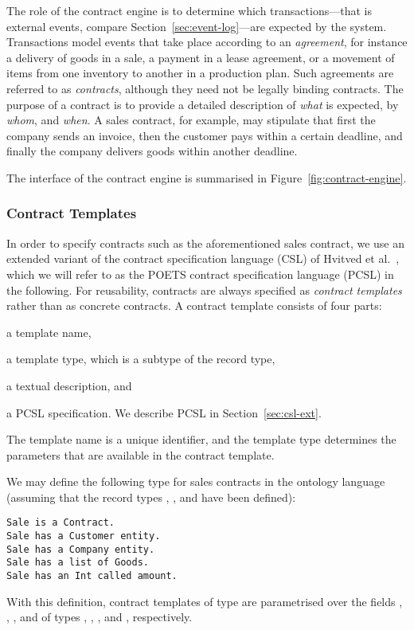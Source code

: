 The role of the contract engine is to determine which
transactions---that is external events, compare
Section~\ref{sec:event-log}---are expected by the
system. Transactions model events that take place according to an
\emph{agreement}, for instance a delivery of goods in a sale, a payment in a
lease agreement, or a movement of items from one inventory to another
in a production plan. Such agreements are referred to as
\emph{contracts}, although they need not be legally binding
contracts. The purpose of a contract is to provide a detailed
description of \emph{what} is expected, by \emph{whom}, and
\emph{when}. A sales contract, for example, may stipulate that first
the company sends an invoice, then the customer pays within a certain
deadline, and finally the company delivers goods within another
deadline.

The interface of the contract engine is summarised in
Figure~\ref{fig:contract-engine}.

\subsubsection{Contract Templates}
\label{sec:contract-templates}
In order to specify contracts such as the aforementioned sales
contract, we use an extended variant of the contract specification
language (CSL) of Hvitved et al.~\cite{hvitved11jlap}, which we will
refer to as the POETS contract specification language (PCSL) in the
following. For reusability, contracts are always specified as
\emph{contract templates} rather than as concrete contracts. A
contract template consists of four parts:
\begin{inparaenum}[(i)]
\item a template name,
\item a template type, which is a subtype of the 
  record type,
\item a textual description, and
\item a PCSL specification. We describe PCSL in Section~\ref{sec:csl-ext}.
\end{inparaenum}

The template name is a unique identifier, and the template type
determines the parameters that are available in the contract
template.
\begin{example}
  \label{ex:contractType}
  We may define the following type for sales
  contracts in the ontology language (assuming that the record types
  , , and 
  have been defined):
\begin{lstlisting}[language=ontology,basicstyle=\normalsize]
Sale is a Contract.
Sale has a Customer entity. 
Sale has a Company entity. 
Sale has a list of Goods.
Sale has an Int called amount.
\end{lstlisting}
  With this definition, contract templates of type  are
  parametrised over the fields , ,
  , and  of types
  , ,
  , and \tint, respectively.
\end{example}

